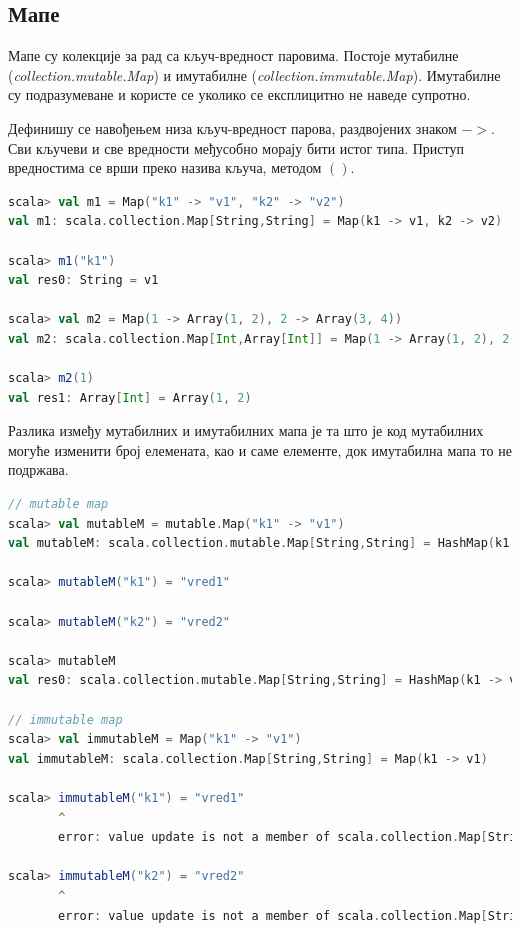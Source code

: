 \documentclass[12pt,oneside]{memoir}
\begin{document}
\subsection{Мапе}
\label{subsec:scala_maps}

Мапе су колекције за рад са кључ-вредност паровима. Постоје мутабилне (\textit{collection.mutable.Map}) и имутабилне (\textit{collection.immutable.Map}). Имутабилне су подразумеване и користе се уколико се експлицитно не наведе супротно.

Дефинишу се навођењем низа кључ-вредност парова, раздвојених знаком $->$. Сви кључеви и све вредности међусобно морају бити истог типа. Приступ вредностима се врши преко назива кључа, методом $()$.

\begin{lstlisting}[language=Scala, caption={Мапе у Скали}, label={lst:scala_app_maps_example}]
scala> val m1 = Map("k1" -> "v1", "k2" -> "v2")
val m1: scala.collection.Map[String,String] = Map(k1 -> v1, k2 -> v2)

scala> m1("k1")
val res0: String = v1

scala> val m2 = Map(1 -> Array(1, 2), 2 -> Array(3, 4))
val m2: scala.collection.Map[Int,Array[Int]] = Map(1 -> Array(1, 2), 2 -> Array(3, 4))

scala> m2(1)
val res1: Array[Int] = Array(1, 2)
\end{lstlisting}

Разлика између мутабилних и имутабилних мапа је та што је код мутабилних могуће изменити број елемената, као и саме елементе, док имутабилна мапа то не подржава.

\begin{lstlisting}[language=Scala, caption={Измена и додавање елемента код мутабилних и имутабилних мапа}, label={lst:scala_coll_maps_mutable_immutable}]
// mutable map
scala> val mutableM = mutable.Map("k1" -> "v1")
val mutableM: scala.collection.mutable.Map[String,String] = HashMap(k1 -> v1)

scala> mutableM("k1") = "vred1"

scala> mutableM("k2") = "vred2"

scala> mutableM
val res0: scala.collection.mutable.Map[String,String] = HashMap(k1 -> vred1, k2 -> vred2)

// immutable map
scala> val immutableM = Map("k1" -> "v1")
val immutableM: scala.collection.Map[String,String] = Map(k1 -> v1)

scala> immutableM("k1") = "vred1"
       ^
       error: value update is not a member of scala.collection.Map[String,String]

scala> immutableM("k2") = "vred2"
       ^
       error: value update is not a member of scala.collection.Map[String,String]

\end{lstlisting}
\end{document}
